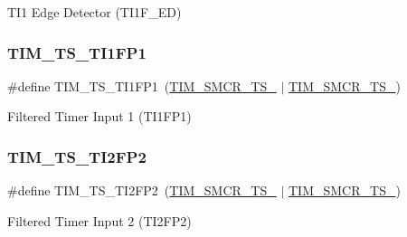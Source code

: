 T\+I1 Edge Detector (T\+I1\+F\+\_\+\+ED) \mbox{\label{group___t_i_m___trigger___selection_ga38d3514d54bcdb0ea8ac8bd91c5832b5}} 
\subsubsection{\texorpdfstring{T\+I\+M\+\_\+\+T\+S\+\_\+\+T\+I1\+F\+P1}{TIM\_TS\_TI1FP1}}
{\footnotesize\ttfamily \#define T\+I\+M\+\_\+\+T\+S\+\_\+\+T\+I1\+F\+P1~(\hyperlink{group___peripheral___registers___bits___definition_ga8d1f040f9259acb3c2fba7b0c7eb3d96}{T\+I\+M\+\_\+\+S\+M\+C\+R\+\_\+\+T\+S\+\_} $\vert$ \hyperlink{group___peripheral___registers___bits___definition_gacf0dbaf4a2ec8759f283f82a958ef6a8}{T\+I\+M\+\_\+\+S\+M\+C\+R\+\_\+\+T\+S\+\_})}

Filtered Timer Input 1 (T\+I1\+F\+P1) \mbox{\label{group___t_i_m___trigger___selection_ga0ed58a269bccd3f22d19cc9a2ba3123f}} 
\subsubsection{\texorpdfstring{T\+I\+M\+\_\+\+T\+S\+\_\+\+T\+I2\+F\+P2}{TIM\_TS\_TI2FP2}}
{\footnotesize\ttfamily \#define T\+I\+M\+\_\+\+T\+S\+\_\+\+T\+I2\+F\+P2~(\hyperlink{group___peripheral___registers___bits___definition_gacb82212fcc89166a43ff97542da9182d}{T\+I\+M\+\_\+\+S\+M\+C\+R\+\_\+\+T\+S\+\_} $\vert$ \hyperlink{group___peripheral___registers___bits___definition_gacf0dbaf4a2ec8759f283f82a958ef6a8}{T\+I\+M\+\_\+\+S\+M\+C\+R\+\_\+\+T\+S\+\_})}

Filtered Timer Input 2 (T\+I2\+F\+P2) 